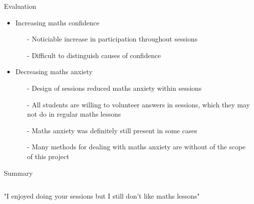 \documentclass{beamer}  %
\begin{document}
\begin{frame}{Evaluation}
    \begin{itemize}
        \item Increasing maths confidence
        \begin{itemize}
            \item[-] Noticiable increase in participation throughout sessions
            \item[-] Difficult to distinguish causes of confidence
        \end{itemize}
        \item Decreasing maths anxiety
        \begin{itemize}
            \item[-] Design of sessions reduced maths anxiety within sessions
            \item[-] All students are willing to volunteer answers in sessions, which they may not do in regular maths lessons
            \item[-] Maths anxiety was definitely still present in some cases 
            \item[-] Many methods for dealing with maths anxiety are without of the scope of this project
        \end{itemize}
    \end{itemize}


\end{frame}

\begin{frame}{Summary}
    \begin{columns}
            "I enjoyed doing your sessions but I still don't like maths lessons"
    \end{columns}
\end{frame}
\end{document}
